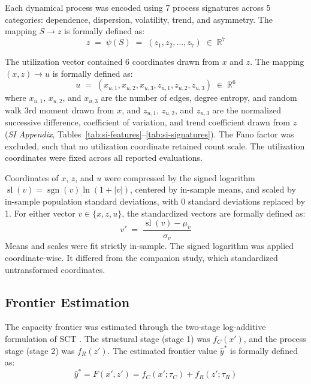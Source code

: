 \documentclass{article}
\begin{document}
Each dynamical process was encoded using 7 process signatures across 5 categories: dependence, dispersion, volatility, trend, and asymmetry. The mapping $S \to z$ is formally defined as:
\begin{equation}
    z \;=\; \psi(S) \;=\; (z_1, z_2, \ldots, z_7) \;\in\; \mathbb{R}^{7}
\label{eq:signatures}
\end{equation}

The utilization vector contained 6 coordinates drawn from $x$ and $z$. The mapping $(x, z) \to u$ is formally defined as:
\begin{equation}
    u \;=\; (x_{u,1}, x_{u,2}, x_{u,3}, z_{u,1}, z_{u,2}, z_{u,3}) \;\in\; \mathbb{R}^{6}
\label{eq:utilization}
\end{equation}
where $x_{u,1}$, $x_{u,2}$, and $x_{u,3}$ are the number of edges, degree entropy, and random walk 3rd moment drawn from $x$, and $z_{u,1}$, $z_{u,2}$, and $z_{u,3}$ are the normalized successive difference, coefficient of variation, and trend coefficient drawn from $z$ (\textit{SI Appendix}, Tables~\ref{tab:si-features}--\ref{tab:si-signatures}). The Fano factor was excluded, such that no utilization coordinate retained count scale. The utilization coordinates were fixed across all reported evaluations.

Coordinates of $x$, $z$, and $u$ were compressed by the signed logarithm $\operatorname{sl}(v) = \operatorname{sgn}(v)\ln(1 + \lvert v \rvert)$, centered by in-sample means, and scaled by in-sample population standard deviations, with 0 standard deviations replaced by 1. For either vector $v \in \{x, z, u\}$, the standardized vectors are formally defined as:
\begin{equation}
v' \;=\; \frac{\operatorname{sl}(v) - \mu_v}{\sigma_v}
\label{eq:standardize}
\end{equation}
Means and scales were fit strictly in-sample. The signed logarithm was applied coordinate-wise. It differed from the companion study, which standardized untransformed coordinates.

\subsection*{Frontier Estimation}
\label{sec:frontier}
The capacity frontier was estimated through the two-stage log-additive formulation of SCT \citep{ref122}. The structural stage (stage 1) was $f_C(x')$, and the process stage (stage 2) was $f_R(z')$. The estimated frontier value $\widehat{y}^*$ is formally defined as:
\begin{equation}
\widehat{y}^* = F(x', z') = f_C(x'; \tau_C) + f_R(z'; \tau_R)
\label{eq:frontier}
\end{equation}
\end{document}
